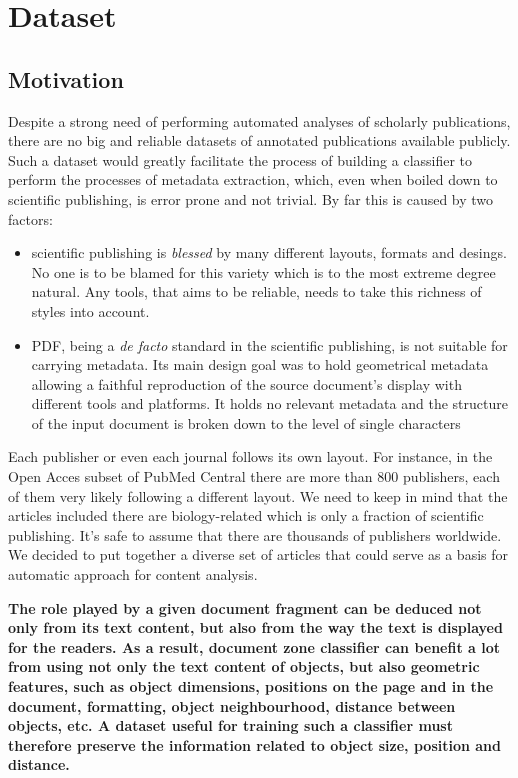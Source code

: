 \chapter{Dataset}
\section{Motivation}
Despite a strong need of performing automated analyses of scholarly publications, there are no big and reliable datasets of annotated publications available publicly. Such a dataset would greatly facilitate the process of building a classifier to perform the processes of metadata extraction, which, even when boiled down to scientific publishing, is error prone and not trivial. By far this is caused by two factors:
\begin{itemize}
\item scientific publishing is \textit{blessed} by many different layouts, formats and desings. No one is to be blamed for this variety which is to the most extreme degree natural. Any tools, that aims to be reliable, needs to take this richness of styles into account.
\item PDF, being a \textit{de facto} standard in the scientific publishing, is not suitable for carrying metadata. Its main design goal was to hold geometrical metadata allowing a faithful reproduction of the source document's display with different tools and platforms. It holds no relevant metadata and the structure of the input document is broken down to the level of single characters
\end{itemize}
Each publisher or even each journal follows its own layout. For instance, in the Open Acces subset of PubMed Central there are more than 800 publishers, each of them very likely following a different layout. We need to keep in mind that the articles included there are biology-related which is only a fraction of scientific publishing. It's safe to assume that there are thousands of publishers worldwide. We decided to put together a diverse set of articles that could serve as a basis for automatic approach for content analysis. 

\textbf{The role played by a given document fragment can be deduced not only from its text content, but also from the way the text is displayed for the readers. As a result, document zone classifier can benefit a lot from using not only the text content of objects, but also geometric features, such as object dimensions, positions on the page and in the document, formatting, object neighbourhood, distance between objects, etc. A dataset useful for training such a classifier must therefore preserve the information related to object size, position and distance.}
